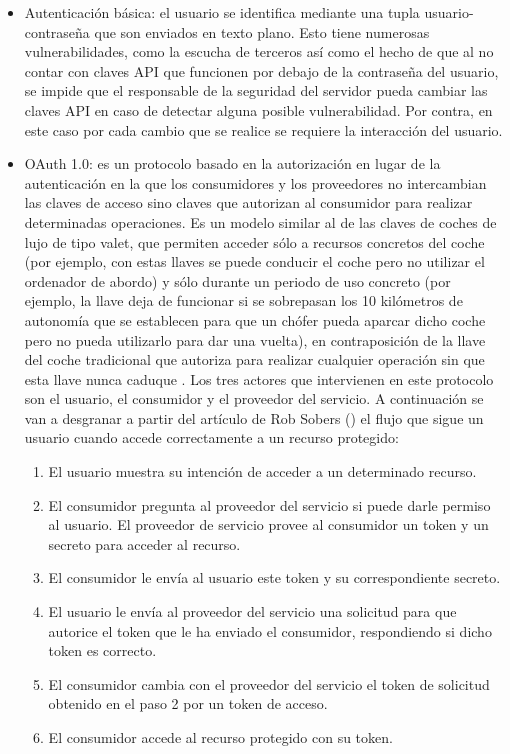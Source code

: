 \begin{itemize}
\item Autenticación básica: el usuario se identifica mediante una tupla usuario-contraseña que son enviados en texto plano. Esto tiene numerosas vulnerabilidades, como la escucha de terceros así como el hecho de que al no contar con claves API que funcionen por debajo de la contraseña del usuario, se impide que el responsable de la seguridad del servidor pueda cambiar las claves API en caso de detectar alguna posible vulnerabilidad. Por contra, en este caso por cada cambio que se realice se requiere la interacción del usuario.

\item OAuth 1.0: es un protocolo basado en la autorización en lugar de la autenticación en la que los consumidores y los proveedores no intercambian las claves de acceso sino claves que autorizan al consumidor para realizar determinadas operaciones. Es un modelo similar al de las claves de coches de lujo de tipo valet, que permiten acceder sólo a recursos concretos del coche (por ejemplo, con estas llaves se puede conducir el coche pero no utilizar el ordenador de abordo) y sólo durante un periodo de uso concreto (por ejemplo, la llave deja de funcionar si se sobrepasan los 10 kilómetros de autonomía que se establecen para que un chófer pueda aparcar dicho coche pero no pueda utilizarlo para dar una vuelta), en contraposición de la llave del coche tradicional que autoriza para realizar cualquier operación sin que esta llave nunca caduque \citep{oauth1}. Los tres actores que intervienen en este protocolo son el usuario, el consumidor y el proveedor del servicio. A continuación se van a desgranar a partir del artículo de Rob Sobers (\citeyear{robsobers}) el flujo que sigue un usuario cuando accede correctamente a un recurso protegido:
\begin{enumerate}
\item El usuario muestra su intención de acceder a un determinado recurso.
\item El consumidor pregunta al proveedor del servicio si puede darle permiso al usuario. El proveedor de servicio provee al consumidor un token y un secreto para acceder al recurso.
\item El consumidor le envía al usuario este token y su correspondiente secreto. 
\item El usuario le envía al proveedor del servicio una solicitud para que autorice el token que le ha enviado el consumidor, respondiendo si dicho token es correcto.
\item El consumidor cambia con el proveedor del servicio el token de solicitud obtenido en el paso 2 por un token de acceso.
\item El consumidor accede al recurso protegido con su token.
\end{enumerate}


\end{itemize}
